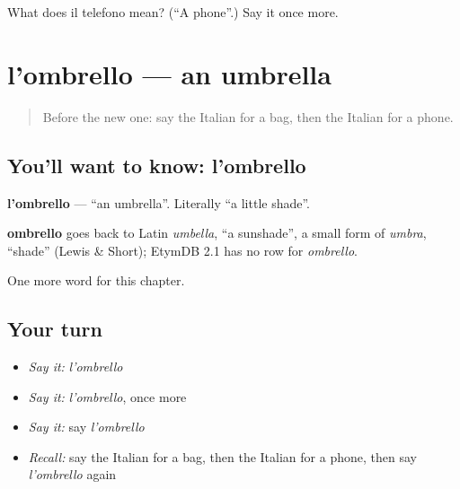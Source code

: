 \begin{tcolorbox}[breakable,colback=teal!4,colframe=teal!35!black,title={Before you move on}]
What does il telefono mean? (\textquotedblleft{}A phone\textquotedblright{}.) Say it once more.
\end{tcolorbox}
\section[l'ombrello]{l'ombrello — an umbrella}

\label{lesson:IT-C62-ombrello}



\begin{quote}
Before the new one: say the Italian for a bag, then the Italian for a phone.
\end{quote}

\subsection*{You'll want to know: l'ombrello}
\textbf{l'ombrello} — \textquotedblleft{}an umbrella\textquotedblright{}. Literally \textquotedblleft{}a little shade\textquotedblright{}.

\begin{cousinweb}
\textbf{ombrello} goes back to Latin \emph{umbella}, \textquotedblleft{}a sunshade\textquotedblright{}, a small form of \emph{umbra}, \textquotedblleft{}shade\textquotedblright{} (Lewis \& Short); EtymDB 2.1 has no row for \emph{ombrello}.
\end{cousinweb}

\begin{grammarlens}[title={What you've built}]
One more word for this chapter.
\end{grammarlens}

\subsection*{Your turn}
\begin{itemize}
\raggedright
  \item \emph{Say it:} \emph{l'ombrello}
  \item \emph{Say it:} \emph{l'ombrello}, once more
  \item \emph{Say it:} say \emph{l'ombrello}
  \item \emph{Recall:} say the Italian for a bag, then the Italian for a phone, then say \emph{l'ombrello} again
\end{itemize}

